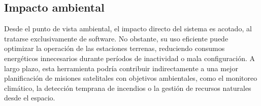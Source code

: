 \subsection*{Impacto ambiental}

Desde el punto de vista ambiental, el impacto directo del sistema es acotado, al tratarse exclusivamente de software. No obstante, su uso eficiente puede optimizar la operación de las estaciones terrenas, reduciendo consumos energéticos innecesarios durante períodos de inactividad o mala configuración. A largo plazo, esta herramienta podría contribuir indirectamente a una mejor planificación de misiones satelitales con objetivos ambientales, como el monitoreo climático, la detección temprana de incendios o la gestión de recursos naturales desde el espacio.
